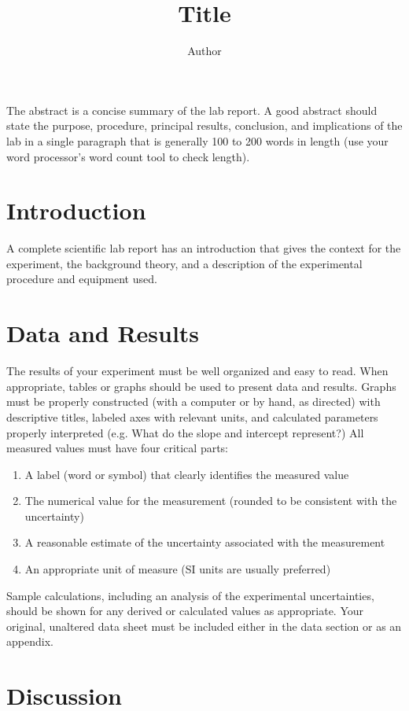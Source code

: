 \documentclass[12pt, letterpaper]{article}
\title{Title}
\author{Author}
\date{}  %
\begin{document}
\maketitle

The abstract is a concise summary of the lab report. A good abstract should state the purpose, procedure, principal 
results, conclusion, and implications of the lab in a single paragraph that is generally 100 to 200 words in length 
(use your word processor’s word count tool to check length).
\section{Introduction}

A complete scientific lab report has an introduction that gives the context for the experiment, the background theory, 
and a description of the experimental procedure and equipment used. 

\section{Data and Results}

The results of your experiment must be well organized and easy to read. When appropriate, tables or graphs should 
be used to present data and results. Graphs must be properly constructed (with a computer or by hand, as directed) 
with descriptive titles, labeled axes with relevant units, and calculated parameters properly interpreted (e.g. What do 
the slope and intercept represent?) All measured values must have four critical parts:
\begin{enumerate}
    \item A label (word or symbol) that clearly identifies the measured value
    \item The numerical value for the measurement (rounded to be consistent with the uncertainty)
    \item A reasonable estimate of the uncertainty associated with the measurement
    \item An appropriate unit of measure (SI units are usually preferred)
\end{enumerate}


Sample calculations, including an analysis of the experimental uncertainties, should be shown for any derived or 
calculated values as appropriate. Your original, unaltered data sheet must be included either in the data section or 
as an appendix.
\section{Discussion}
\end{document}
